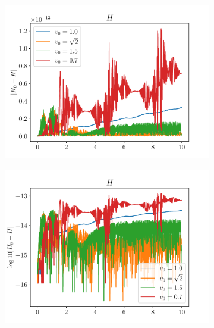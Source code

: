 \begin{figure}
    \centering
    \begin{subfigure}{0.48\textwidth}
        \includegraphics[width=\textwidth]{../images/1-1-H_lin.pdf}
    \end{subfigure}
    \hfill
    \begin{subfigure}{0.48\textwidth}
        \includegraphics[width=\textwidth]{../images/1-1-H_log.pdf}
    \end{subfigure}
    \newline
    \begin{subfigure}{0.48\textwidth}

\end{subfigure}
\end{figure}
